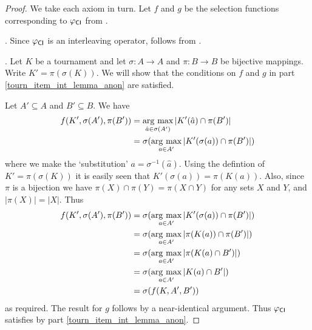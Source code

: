 \begin{proof}

    We take each axiom in turn. Let $f$ and $g$ be the selection functions
    corresponding to ${\varphi_{\mathsf{CI}}}$ from .

    \chaindef{}. Since ${\varphi_{\mathsf{CI}}}$ is an interleaving operator,
    \chaindef{} follows from .

    \anon{}. Let $K$ be a tournament and let $\sigma: A \to A$ and $\pi:
    B \to B$ be bijective mappings. Write $K' = \pi(\sigma(K))$. We will show
    that the conditions on $f$ and $g$ in
     part
    \cref{tourn_item_int_lemma_anon} are satisfied.

    Let $A' \subseteq A$ and $B' \subseteq B$. We have
    \begin{align*}
        f(K', \sigma(A'), \pi(B'))
        &= \operatorname*{arg\ max}_{\hat{a} \in \sigma(A')}{|K'(\hat{a}) \cap \pi(B')|} \\
        &= \sigma(\operatorname*{arg\ max}_{a \in A'}{|K'(\sigma(a)) \cap \pi(B')|})
    \end{align*}
    where we make the `substitution' $a = \sigma^{-1}(\hat{a})$. Using the
    defintion of $K' = \pi(\sigma(K))$ it is easily seen that $K'(\sigma(a)) =
    \pi(K(a))$. Also, since $\pi$ is a bijection we have $\pi(X) \cap \pi(Y) =
    \pi(X \cap Y)$ for any sets $X$ and $Y$, and $|\pi(X)| = |X|$. Thus
    \begin{align*}
        f(K', \sigma(A'), \pi(B'))
        &= \sigma(\operatorname*{arg\ max}_{a \in A'}{|K'(\sigma(a)) \cap \pi(B')|}) \\
        &= \sigma(\operatorname*{arg\ max}_{a \in A'}{|\pi(K(a)) \cap \pi(B')|}) \\
        &= \sigma(\operatorname*{arg\ max}_{a \in A'}{|\pi(K(a) \cap B')|}) \\
        &= \sigma(\operatorname*{arg\ max}_{a \in A'}{|K(a) \cap B'|}) \\
        &= \sigma(f(K, A', B'))
    \end{align*}
    as required. The result for $g$ follows by a near-identical argument. Thus
    ${\varphi_{\mathsf{CI}}}$ satisfies \anon{} by
     part
    \cref{tourn_item_int_lemma_anon}.


\end{proof}
